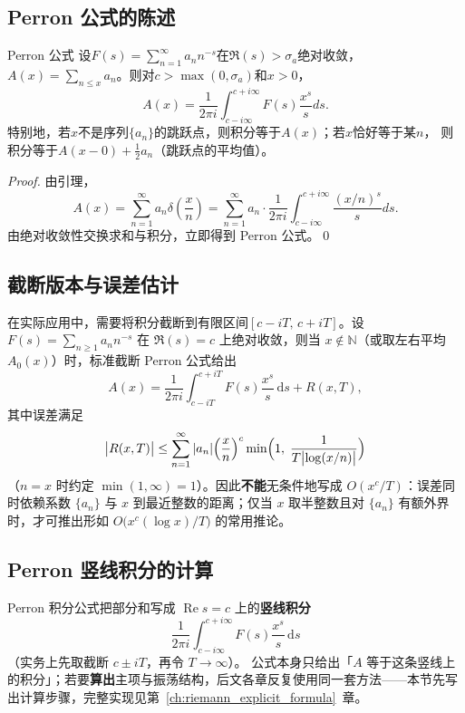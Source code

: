 \subsection{Perron 公式的陈述}

\begin{theorem}{Perron 公式}{}
设$F(s) = \sum_{n=1}^{\infty} a_n n^{-s}$在$\Re(s) > \sigma_a$绝对收敛，
$A(x) = \sum_{n \le x} a_n$。则对$c > \max(0, \sigma_a)$和$x > 0$，
\[
A(x) = \frac{1}{2\pi i} \int_{c-i\infty}^{c+i\infty} F(s) \frac{x^s}{s} ds.
\]
特别地，若$x$不是序列$\{a_n\}$的跳跃点，则积分等于$A(x)$；若$x$恰好等于某$n$，
则积分等于$A(x-0) + \frac{1}{2}a_n$（跳跃点的平均值）。
\end{theorem}

\begin{proof}
由引理，
\[
A(x) = \sum_{n=1}^{\infty} a_n \delta\!\left(\frac{x}{n}\right) = \sum_{n=1}^{\infty} a_n \cdot \frac{1}{2\pi i} \int_{c-i\infty}^{c+i\infty} \frac{(x/n)^s}{s} ds.
\]
由绝对收敛性交换求和与积分，立即得到 Perron 公式。\qed
\end{proof}

\subsection{截断版本与误差估计}\label{subsec:perron_truncation}

在实际应用中，需要将积分截断到有限区间$[c-iT,\, c+iT]$。设 $F(s)=\sum_{n\ge 1}a_n n^{-s}$ 在 $\Re(s)=c$ 上绝对收敛，则当 $x\notin\mathbb{N}$（或取左右平均 $A_0(x)$）时，标准截断 Perron 公式给出
\[
A(x)
=
\frac{1}{2\pi i}
\int_{c-iT}^{c+iT} F(s)\frac{x^s}{s}\,\mathrm{d}s
+
R(x,T),
\]
其中误差满足
\[
\bigl|R(x,T)\bigr|
\le
\sum_{n=1}^{\infty}
|a_n|
\Bigl(\frac{x}{n}\Bigr)^{c}
\min\Bigl(1,\;\frac{1}{T\bigl|\log(x/n)\bigr|}\Bigr)
\]
（$n=x$ 时约定 $\min(1,\infty)=1$）。因此\textbf{不能}无条件地写成 $O(x^c/T)$：误差同时依赖系数 $\{a_n\}$ 与 $x$ 到最近整数的距离；仅当 $x$ 取半整数且对 $\{a_n\}$ 有额外界时，才可推出形如 $O\!\bigl(x^c(\log x)/T\bigr)$ 的常用推论。

\subsection{Perron 竖线积分的计算}
\label{subsec:perron_contour_method}

Perron 积分公式把部分和写成 $\operatorname{Re}s=c$ 上的\textbf{竖线积分}
\[
  \frac{1}{2\pi i}\int_{c-i\infty}^{c+i\infty} F(s)\frac{x^s}{s}\,\mathrm{d}s
\]
（实务上先取截断 $c\pm iT$，再令 $T\to\infty$）。
公式本身只给出「$A$ 等于这条竖线上的积分」；若要\textbf{算出}主项与振荡结构，后文各章反复使用同一套方法——本节先写出计算步骤，完整实现见第~\ref{ch:riemann_explicit_formula}~章。

